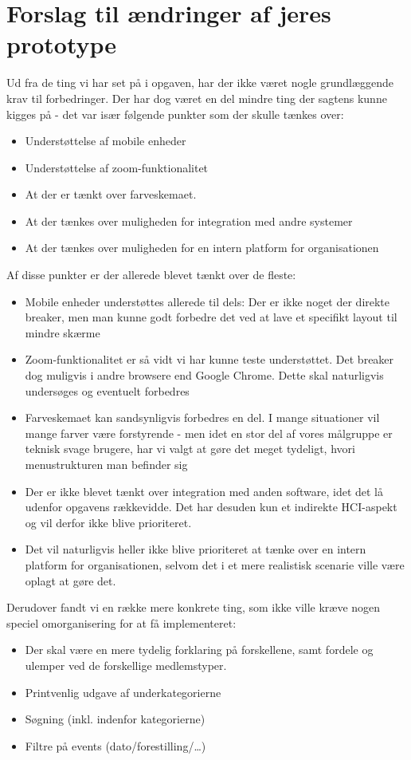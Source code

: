 \section{Forslag til ændringer af jeres prototype}

Ud fra de ting vi har set på i opgaven, har der ikke været nogle grundlæggende
krav til forbedringer. Der har dog været en del mindre ting der sagtens kunne
kigges på - det var især følgende punkter som der skulle tænkes over:

\begin{itemize}
\item Understøttelse af mobile enheder
\item Understøttelse af zoom-funktionalitet
\item At der er tænkt over farveskemaet.
\item At der tænkes over muligheden for integration med andre systemer
\item At der tænkes over muligheden for en intern platform for organisationen
\end{itemize}

Af disse punkter er der allerede blevet tænkt over de fleste:
\begin{itemize}
\item Mobile enheder understøttes allerede til dels: Der er ikke noget der
direkte breaker, men man kunne godt forbedre det ved at lave et specifikt layout
til mindre skærme
\item Zoom-funktionalitet er så vidt vi har kunne teste understøttet. Det
breaker dog muligvis i andre browsere end Google Chrome. Dette skal naturligvis
undersøges og eventuelt forbedres
\item Farveskemaet kan sandsynligvis forbedres en del. I mange situationer vil
mange farver være forstyrende - men idet en stor del af vores målgruppe er
teknisk svage brugere, har vi valgt at gøre det meget tydeligt, hvori
menustrukturen man befinder sig
\item Der er ikke blevet tænkt over integration med anden software, idet det
lå udenfor opgavens rækkevidde. Det har desuden kun et indirekte HCI-aspekt og
vil derfor ikke blive prioriteret.
\item Det vil naturligvis heller ikke blive prioriteret at tænke over en intern
platform for organisationen, selvom det i et mere realistisk scenarie ville være
oplagt at gøre det.
\end{itemize}

Derudover fandt vi en række mere konkrete ting, som ikke ville kræve nogen
speciel omorganisering for at få implementeret:

\begin{itemize}
\item Der skal være en mere tydelig forklaring på forskellene, samt fordele og
ulemper ved de forskellige medlemstyper.
\item Printvenlig udgave af underkategorierne
\item Søgning (inkl. indenfor kategorierne)
\item Filtre på events (dato/forestilling/\ldots)
\end{itemize}
